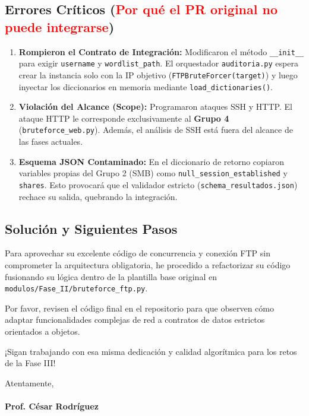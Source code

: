 \documentclass[12pt,letterpaper]{article}
\begin{document}
\subsection*{Errores Críticos (\textcolor{red}{Por qué el PR original no puede integrarse})}
\begin{enumerate}
    \item \textbf{Rompieron el Contrato de Integración:} Modificaron el método \texttt{\_\_init\_\_} para exigir \texttt{username} y \texttt{wordlist\_path}. El orquestador \texttt{auditoria.py} espera crear la instancia solo con la IP objetivo (\texttt{FTPBruteForcer(target)}) y luego inyectar los diccionarios en memoria mediante \texttt{load\_dictionaries()}.
    \item \textbf{Violación del Alcance (Scope):} Programaron ataques SSH y HTTP. El ataque HTTP le corresponde exclusivamente al \textbf{Grupo 4} (\texttt{bruteforce\_web.py}). Además, el análisis de SSH está fuera del alcance de las fases actuales.
    \item \textbf{Esquema JSON Contaminado:} En el diccionario de retorno copiaron variables propias del Grupo 2 (SMB) como \texttt{null\_session\_established} y \texttt{shares}. Esto provocará que el validador estricto (\texttt{schema\_resultados.json}) rechace su salida, quebrando la integración.
\end{enumerate}

\subsection*{Solución y Siguientes Pasos}
Para aprovechar su excelente código de concurrencia y conexión FTP sin comprometer la arquitectura obligatoria, he procedido a refactorizar su código fusionando su lógica dentro de la plantilla base original en \texttt{modulos/Fase\_II/bruteforce\_ftp.py}.

Por favor, revisen el código final en el repositorio para que observen cómo adaptar funcionalidades complejas de red a contratos de datos estrictos orientados a objetos. 

\vspace{0.3cm}
¡Sigan trabajando con esa misma dedicación y calidad algorítmica para los retos de la Fase III!

\vspace{1cm}
\noindent Atentamente, \\
\vspace{0.5cm} \\
\textbf{Prof. César Rodríguez}
\end{document}
